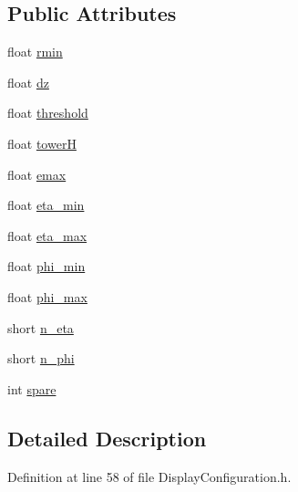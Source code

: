 \subsection*{Public Attributes}
\begin{DoxyCompactItemize}
\item 
float \hyperlink{struct_d_d4hep_1_1_display_configuration_1_1_calodata_ad66aad4f3af180d086d38e843e85aacf}{rmin}
\item 
float \hyperlink{struct_d_d4hep_1_1_display_configuration_1_1_calodata_add8df58585b1231290a12e7da2f2621f}{dz}
\item 
float \hyperlink{struct_d_d4hep_1_1_display_configuration_1_1_calodata_a83c052550585418a3f64e5b1b34d5d76}{threshold}
\item 
float \hyperlink{struct_d_d4hep_1_1_display_configuration_1_1_calodata_a9b1ac13cbc2a38b0b9fed9d8d431060c}{towerH}
\item 
float \hyperlink{struct_d_d4hep_1_1_display_configuration_1_1_calodata_a471e0a91b9b45ba9b9917e1ef6d0bba8}{emax}
\item 
float \hyperlink{struct_d_d4hep_1_1_display_configuration_1_1_calodata_a9a610caa053f259f21ee4051de9c7160}{eta\_\-min}
\item 
float \hyperlink{struct_d_d4hep_1_1_display_configuration_1_1_calodata_ac4cd456a1e2d56e753b3c298f1c864b0}{eta\_\-max}
\item 
float \hyperlink{struct_d_d4hep_1_1_display_configuration_1_1_calodata_ab35d557de81c5fe8dbfecefda9e83cfb}{phi\_\-min}
\item 
float \hyperlink{struct_d_d4hep_1_1_display_configuration_1_1_calodata_ae0666a2af1e429c873b335c99545ad21}{phi\_\-max}
\item 
short \hyperlink{struct_d_d4hep_1_1_display_configuration_1_1_calodata_a0f4545d6efc01e1496fafdd925a4bdcd}{n\_\-eta}
\item 
short \hyperlink{struct_d_d4hep_1_1_display_configuration_1_1_calodata_a30fd6c2e98b91f76c020d803c0cf10fd}{n\_\-phi}
\item 
int \hyperlink{struct_d_d4hep_1_1_display_configuration_1_1_calodata_abda3e84b84be3024b62145411f0f125e}{spare}
\end{DoxyCompactItemize}


\subsection{Detailed Description}


Definition at line 58 of file DisplayConfiguration.h.

